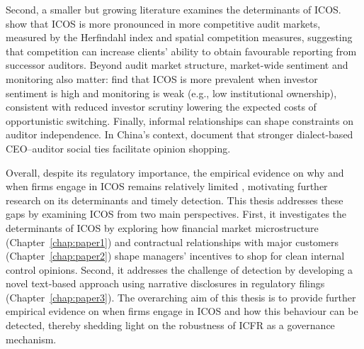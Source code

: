 \documentclass[12pt, a4paper]{report}
\begin{document}
Second, a smaller but growing literature examines the determinants of ICOS. \cite{newtonInternalControlOpinion2016} show that ICOS is more pronounced in more competitive audit markets, measured by the Herfindahl index and spatial competition measures, suggesting that competition can increase clients' ability to obtain favourable reporting from successor auditors. Beyond audit market structure, market-wide sentiment and monitoring also matter: \cite{aminInvestorSentimentAudit2021} find that ICOS is more prevalent when investor sentiment is high and monitoring is weak (e.g., low institutional ownership), consistent with reduced investor scrutiny lowering the expected costs of opportunistic switching. Finally, informal relationships can shape constraints on auditor independence. In China's context, \cite{duDoesCEOAuditor2022} document that stronger dialect-based CEO--auditor social ties facilitate opinion shopping.

Overall, despite its regulatory importance, the empirical evidence on why and when firms engage in ICOS remains relatively limited \citep{defondReviewArchivalAuditing2014}, motivating further research on its determinants and timely detection. This thesis addresses these gaps by examining ICOS from two main perspectives. First, it investigates the determinants of ICOS by exploring how financial market microstructure (Chapter~\ref{chap:paper1}) and contractual relationships with major customers (Chapter~\ref{chap:paper2}) shape managers' incentives to shop for clean internal control opinions. Second, it addresses the challenge of detection by developing a novel text-based approach using narrative disclosures in regulatory filings (Chapter~\ref{chap:paper3}). The overarching aim of this thesis is to provide further empirical evidence on when firms engage in ICOS and how this behaviour can be detected, thereby shedding light on the robustness of ICFR as a governance mechanism.
\end{document}
